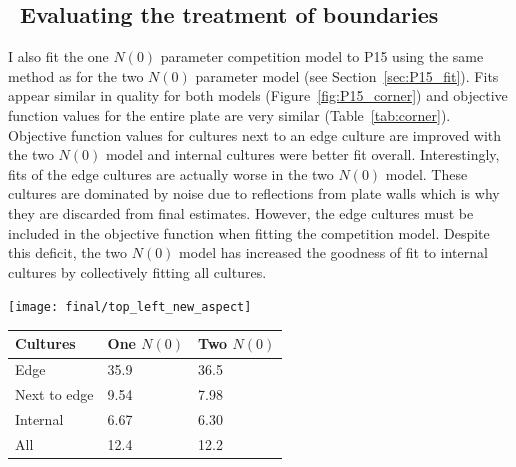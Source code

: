 \subsection{\thesubsection~Evaluating the treatment of boundaries}

I also fit the one \(N(0)\) parameter competition model to P15 using
the same method as for the two \(N(0)\) parameter model (see
Section~\ref{sec:P15_fit}). Fits appear similar in quality for both
models (Figure~\ref{fig:P15_corner}) and objective function values for
the entire plate are very similar (Table~\ref{tab:corner}). Objective
function values for cultures next to an edge culture are improved with
the two \(N(0)\) model and internal cultures were better fit
overall. Interestingly, fits of the edge cultures are actually worse
in the two \(N(0)\) model. These cultures are dominated by noise due
to reflections from plate walls which is why they are discarded from
final estimates. However, the edge cultures must be included in the
objective function when fitting the competition model. Despite this
deficit, the two \(N(0)\) model has increased the goodness of fit to
internal cultures by collectively fitting all cultures.


\graphicspath{{images/corners/}}
\begin{Figure}
  \centering
  \texttt{[image: final/top\_left\_new\_aspect]}
  \label{fig:P15_corner}
\end{Figure}


\begin{center}
  \begin{tabular}{l l l}
    \hline
    Cultures     & One \(N(0)\)  & Two \(N(0)\) \\
    \hline
    Edge         & 35.9    & 36.5\\
    Next to edge & 9.54    & 7.98\\
    Internal     & 6.67    & 6.30\\
    All          & 12.4    & 12.2\\
    \hline
  \end{tabular}
  \label{tab:corner}
\end{center}


